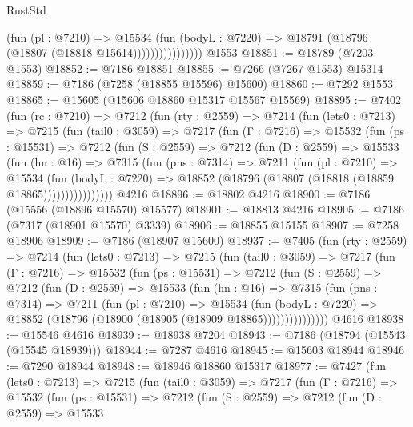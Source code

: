 \begin{lexlean}{RustStd}
\begin{coremodule}
{\begin{coremodule}
{{{{{{{{{{{{{{{{{{{{{{{{{{{{{{{{                          (fun (pl : @7210) =>
                          @15534
                            (fun (bodyL : @7220) =>
                            @18791 (@18796 (@18807 (@18818 @15614))))))))))))))))
    @1553
@18851 := @18789 (@7203 @1553)
@18852 := @7186 @18851
@18855 := @7266 (@7267 @1553) @15314
@18859 := @7186 (@7258 (@18855 @15596) @15600)
@18860 := @7292 @1553
@18865 := @15605 (@15606 @18860 @15317 @15567 @15569)
@18895 := @7402
    (fun (rc : @7210) =>
    @7212
      (fun (rty : @2559) =>
      @7214
        (fun (lets0 : @7213) =>
        @7215
          (fun (tail0 : @3059) =>
          @7217
            (fun (Γ : @7216) =>
            @15532
              (fun (ps : @15531) =>
              @7212
                (fun (S : @2559) =>
                @7212
                  (fun (D : @2559) =>
                  @15533
                    (fun (hn : @16) =>
                    @7315
                      (fun (pns : @7314) =>
                      @7211
                        (fun (pl : @7210) =>
                        @15534
                          (fun (bodyL : @7220) =>
                          @18852 (@18796 (@18807 (@18818 (@18859 @18865))))))))))))))))
    @4216
@18896 := @18802 @4216
@18900 := @7186 (@15556 (@18896 @15570) @15577)
@18901 := @18813 @4216
@18905 := @7186 (@7317 (@18901 @15570) @3339)
@18906 := @18855 @15155
@18907 := @7258 @18906
@18909 := @7186 (@18907 @15600)
@18937 := @7405
    (fun (rty : @2559) =>
    @7214
      (fun (lets0 : @7213) =>
      @7215
        (fun (tail0 : @3059) =>
        @7217
          (fun (Γ : @7216) =>
          @15532
            (fun (ps : @15531) =>
            @7212
              (fun (S : @2559) =>
              @7212
                (fun (D : @2559) =>
                @15533
                  (fun (hn : @16) =>
                  @7315
                    (fun (pns : @7314) =>
                    @7211
                      (fun (pl : @7210) =>
                      @15534
                        (fun (bodyL : @7220) =>
                        @18852 (@18796 (@18900 (@18905 (@18909 @18865)))))))))))))))
    @4616
@18938 := @15546 @4616
@18939 := @18938 @7204
@18943 := @7186 (@18794 (@15543 (@15545 @18939)))
@18944 := @7287 @4616
@18945 := @15603 @18944
@18946 := @7290 @18944
@18948 := @18946 @18860 @15317
@18977 := @7427
    (fun (lets0 : @7213) =>
    @7215
      (fun (tail0 : @3059) =>
      @7217
        (fun (Γ : @7216) =>
        @15532
          (fun (ps : @15531) =>
          @7212
            (fun (S : @2559) =>
            @7212
              (fun (D : @2559) =>
              @15533
}}}}}}}}}}}}}}}}}}}}}}}}}}}}}}}}
\end{coremodule}}
\end{coremodule}
\end{lexlean}
